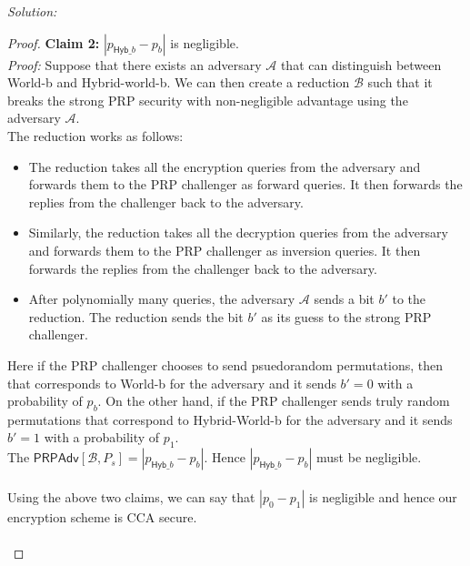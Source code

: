 \documentclass[a4paper, 11pt]{article}
\newenvironment{solution}
    {\textit{Solution:}}
    {\clearpage}
\newcommand{\hyb}{\mathsf{Hyb}}
\newcommand{\calA}{\mathcal{A}}
\newcommand{\calB}{\mathcal{B}}
\begin{document}
\begin{solution}
\begin{enumerate}[(a)]
\begin{proof}
                  \textbf{Claim 2:} $|p_{\hyb\_b} - p_b|$ is negligible. \\
                  \textit{Proof:} Suppose that there exists an adversary $\calA$ that can distinguish between World-b and Hybrid-world-b. We can then create a reduction $\calB$ such that it breaks the strong PRP security with non-negligible advantage using the adversary $\calA$.\\
                  The reduction works as follows:
                  \begin{itemize}
                      \item The reduction takes all the encryption queries from the adversary and forwards them to the PRP challenger as forward queries. It then forwards the replies from the challenger back to the adversary.
                      \item Similarly, the reduction takes all the decryption queries from the adversary and forwards them to the PRP challenger as inversion queries. It then forwards the replies from the challenger back to the adversary.
                      \item After polynomially many queries, the adversary $\calA$ sends a bit $b'$ to the reduction. The reduction sends the bit $b'$ as its guess to the strong PRP challenger.
                  \end{itemize}
                  Here if the PRP challenger chooses to send psuedorandom permutations, then that corresponds to World-b for the adversary and it sends $b' = 0$ with a probability of $p_b$. On the other hand, if the PRP challenger sends truly random permutations that correspond to Hybrid-World-b for the adversary and it sends $b' = 1$ with a probability of $p_1$. \\
                  The $\mathsf{PRPAdv}[\calB, P_s] = |p_{\hyb\_b} - p_b|$. Hence $|p_{\hyb\_b} - p_b|$ must be negligible.\\ \\
                  Using the above two claims, we can say that $|p_0 - p_1|$ is negligible and hence our encryption scheme is CCA secure.
                  \\ \\
              \end{proof}
              
    \end{enumerate}

\end{solution}
\end{document}
